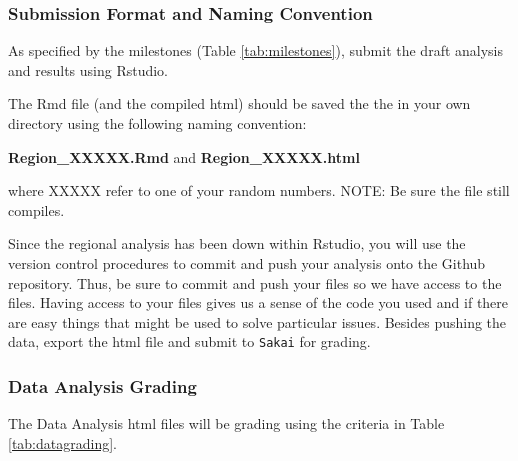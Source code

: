   


\subsubsection{Submission Format and Naming Convention}

As specified by the milestones (Table \ref{tab:milestones}), submit the draft analysis and results using Rstudio. 

The Rmd file (and the compiled html) should be saved the the in your own directory using the following naming convention:

\begin{center}
\textbf{Region\_XXXXX.Rmd} and \textbf{Region\_XXXXX.html}
\end{center}

\medskip \noindent where XXXXX refer to one of your random numbers. NOTE: Be sure the file still compiles.

Since the regional analysis has been down within Rstudio, you will use the version control procedures to commit and push your analysis onto the Github repository. Thus, be sure to commit and push your files so we have access to the files. {\color{red} Having access to your files gives us a sense of the code you used and if there are easy things that might be used to solve particular issues. Besides pushing the data, export the html file and submit to \texttt{Sakai} for grading.} 

\subsubsection{Data Analysis Grading}

The Data Analysis html files will be grading using the criteria in Table \ref{tab:datagrading}.

